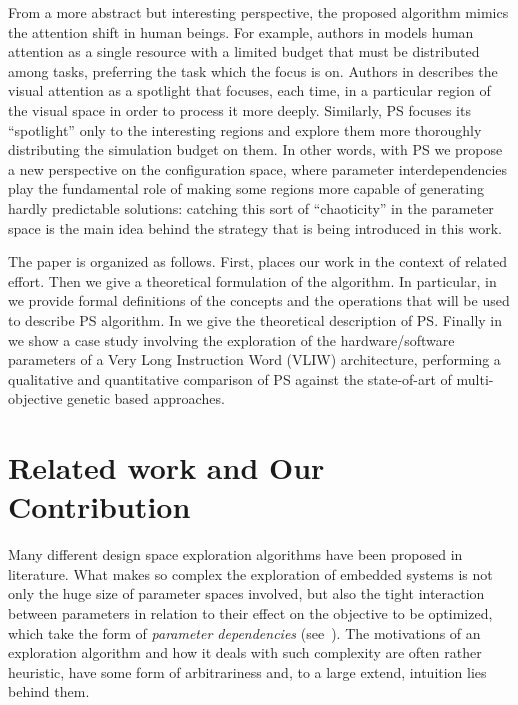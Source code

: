 From a more abstract but interesting perspective, the proposed
algorithm mimics the attention shift in human beings. For example,
authors in \cite{attention} models human attention as a single
resource with a limited budget that must be distributed among tasks,
preferring the task which the focus is on.  Authors in
\cite{spatial_attention} describes the visual attention as a spotlight
that focuses, each time, in a particular region of the visual space in
order to process it more deeply. Similarly, PS focuses its
``spotlight'' only to the interesting regions and explore them more
thoroughly distributing the simulation budget on them.
In other words, with PS we propose a new perspective on the configuration space,
where parameter interdependencies play the fundamental role of making
some regions more capable of generating hardly predictable solutions:
catching this sort of ``chaoticity'' in the parameter space is the
main idea behind the strategy that is being introduced in this work.


The paper is organized as follows. First,  places our work in the context of related effort.
Then we give a theoretical formulation of the algorithm. In particular, in  we provide formal definitions of the concepts and the operations that will be used to describe PS algorithm. In  we give the theoretical description of PS. 
Finally in  we show a case
study involving the exploration of the hardware/software parameters of
a Very Long Instruction Word (VLIW) architecture, performing a
qualitative and quantitative comparison of PS against the state-of-art
of multi-objective genetic based approaches.


\section{Related work and Our Contribution}
Many different design space exploration algorithms have been proposed
in literature.  What makes so complex the exploration of embedded
systems is not only the huge size of parameter spaces involved,
but also the tight interaction between parameters in relation to their
effect on the objective to be optimized, which take the form of
\emph{parameter dependencies} (see~). The 
motivations of an exploration algorithm and how it deals with such
complexity are often rather heuristic, have some form of arbitrariness and,
to a large extend, intuition lies behind them.


